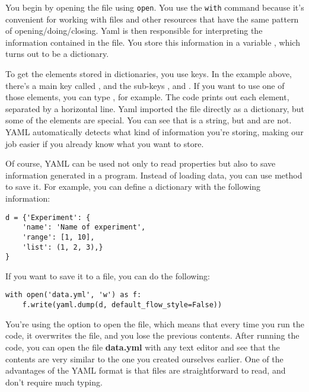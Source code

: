 You begin by opening the file using \texttt{open}. You use the \texttt{with} command because it's convenient for working with files and other resources that have the same pattern of opening/doing/closing. Yaml is then responsible for interpreting the information contained in the file. You store this information in a variable , which turns out to be a dictionary.

To get the elements stored in dictionaries, you use keys. In the example above, there's a main key called , and the sub-keys ,  and . If you want to use one of those elements, you can type , for example. The code prints out each element, separated by a horizontal line. Yaml imported the file directly as a dictionary, but some of the elements are special. You can see that  is a string, but  and  are not. {YAML} automatically detects what kind of information you're storing, making our job easier if you already know what you want to store.



Of course, YAML can be used not only to read properties but also to save information generated in a program. Instead of loading data, you can use  method to save it. For example, you can define a dictionary with the following information:

\begin{verbatim}
d = {'Experiment': {
    'name': 'Name of experiment',
    'range': [1, 10],
    'list': (1, 2, 3),}
}
\end{verbatim}

If you want to save it to a file, you can do the following:

\begin{verbatim}
with open('data.yml', 'w') as f:
    f.write(yaml.dump(d, default_flow_style=False))
\end{verbatim}

You're using the  option to open the file, which means that every time you run the code, it overwrites the file, and you lose the previous contents. After running the code, you can open the file \textbf{data.yml} with any text editor and see that the contents are very similar to the one you created ourselves earlier. One of the advantages of the YAML format is that files are straightforward to read, and don't require much typing.

